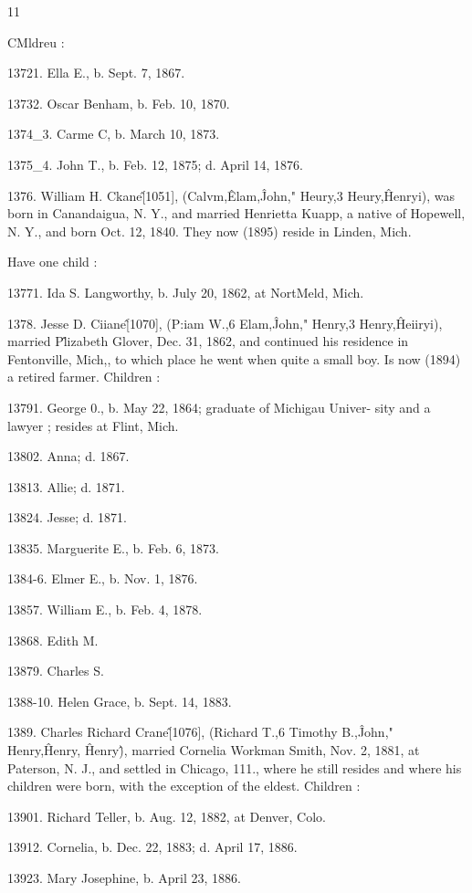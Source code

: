 11 




CMldreu : 

13721. Ella E., b. Sept. 7, 1867. 

13732. Oscar Benham, b. Feb. 10, 1870. 

1374\_3. Carme C, b. March 10, 1873. 

1375\_4. John T., b. Feb. 12, 1875; d. April 14, 1876. 

1376. William H. Ckane\^ [1051], (Calvm,\^ Elam,\^ John," 
Heury,3 Heury,\^ Henryi), was born in Canandaigua, N. Y., and 
married Henrietta Kuapp, a native of Hopewell, N. Y., and born 
Oct. 12, 1840. They now (1895) reside in Linden, Mich. 

Have one child : 

13771. Ida S. Langworthy, b. July 20, 1862, at NortMeld, Mich. 

1378. Jesse D. Ciiane\^ [1070], (P:iam W.,6 Elam,\^ John," 
Henry,3 Henry,\^ Heiiryi), married P\^lizabeth Glover, Dec. 31, 
1862, and continued his residence in Fentonville, Mich,, to which 
place he went when quite a small boy. Is now (1894) a retired 
farmer. Children : 

13791. George 0., b. May 22, 1864; graduate of Michigau Univer- 
sity and a lawyer ; resides at Flint, Mich. 

13802. Anna; d. 1867. 

13813. Allie; d. 1871. 

13824. Jesse; d. 1871. 

13835. Marguerite E., b. Feb. 6, 1873. 

1384-6. Elmer E., b. Nov. 1, 1876. 

13857. William E., b. Feb. 4, 1878. 

13868. Edith M. 

13879. Charles S. 

1388-10. Helen Grace, b. Sept. 14, 1883. 

1389. Charles Richard Crane\^ [1076], (Richard T.,6 
Timothy B.,\^ John," Henry,\^ Henry, \^ Henry\^), married Cornelia 
Workman Smith, Nov. 2, 1881, at Paterson, N. J., and settled 
in Chicago, 111., where he still resides and where his children 
were born, with the exception of the eldest. Children : 

13901. Richard Teller, b. Aug. 12, 1882, at Denver, Colo. 

13912. Cornelia, b. Dec. 22, 1883; d. April 17, 1886. 

13923. Mary Josephine, b. April 23, 1886. 


